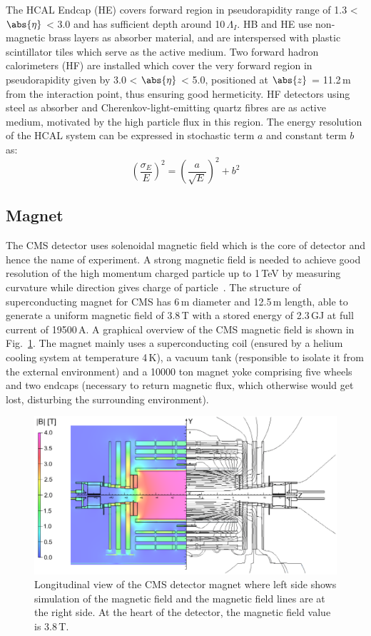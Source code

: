 The HCAL Endcap (HE) covers forward region in pseudorapidity range of 1.3 < $\abs{\eta}$ < 3.0 and has sufficient depth around 10\,$\Lambda_{I}$. HB and HE use non-magnetic brass layers as absorber material, and are interspersed with plastic scintillator tiles which serve as the active medium. Two forward hadron calorimeters (HF) are installed which cover the very forward region in pseudorapidity given by 3.0 < $\abs{\eta}$ < 5.0, positioned at $\abs{z}$ = 11.2\,m from the interaction point, thus ensuring good hermeticity. HF detectors using steel as absorber and Cherenkov-light-emitting quartz fibres are as active medium, motivated by the high particle flux in this region. The energy resolution of the HCAL system can be expressed in stochastic term $a$ and constant term $b$ as:
\begin{equation}
(\frac{\sigma_{E}}{E})^{2} = (\frac{a}{\sqrt{E}})^{2} + b^{2}
\end{equation}
\subsection{Magnet}
The CMS detector uses solenoidal magnetic field which is the core of detector and hence the name of experiment. A strong magnetic field is needed to achieve good resolution of the high momentum charged particle up to 1\,TeV by measuring curvature while direction gives charge of particle~\cite{cms_magnet}. The structure of superconducting magnet for CMS  has 6\,m diameter and 12.5\,m length, able to generate a uniform magnetic field of 3.8\,T with a stored energy of 2.3\,GJ at full current of 19500\,A. A graphical overview of the CMS magnetic field is shown in Fig.~\ref{fig:magnet}. The magnet mainly uses a superconducting coil (ensured by a helium cooling system at temperature 4\,K), a vacuum tank (responsible to isolate it from the external environment) and a 10000 ton magnet yoke comprising five wheels and two endcaps (necessary to return magnetic flux, which otherwise would get lost, disturbing the surrounding environment). 
\begin{figure}[h]
\centering
\includegraphics[scale=0.4]{fig/lhc/Sections_IntroductionFigs_MagField.png}
\caption{\label{fig:magnet} Longitudinal view of the CMS detector magnet where left side shows simulation of the magnetic field and the magnetic field lines are at the right side. At the heart of the detector, the magnetic field value is 3.8\,T.}
\end{figure}
